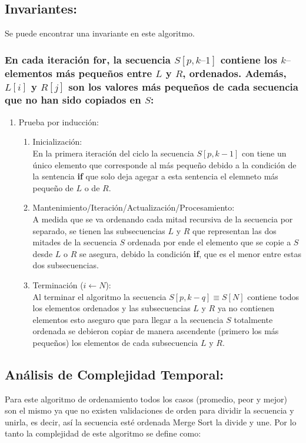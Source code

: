 \documentclass[12pt,spanish]{article}
\theoremstyle{definition}
\begin{document}
\subsection{Invariantes:}{}
Se puede encontrar una invariante en este algoritmo.
\subsubsection{En cada iteración \textbf{for}, la secuencia $S[p, k–1]$ contiene los $k–$elementos más pequeños entre $L$ y $R$, ordenados. Además, $L[i]$ y $R [j]$ son los valores más pequeños de cada secuencia que no han sido copiados en $S$:}{}

\begin{enumerate}

\item Prueba por inducción:
    \begin{enumerate}
    \item Inicialización:\\
        En la primera iteración del ciclo la secuencia $S[p,k-1]$ con tiene un único elemento que corresponde al más pequeño debido a la condición de la sentencia \textbf{if} que solo deja agegar a esta sentencia el elemneto más pequeño de $L$ o de $R$.
    \item Mantenimiento/Iteración/Actualización/Procesamiento:\\
        A medida que se va ordenando cada mitad recursiva de la secuencia por separado, se tienen las subsecuencias $L$ y $R$ que representan las dos mitades de la secuencia $S$ ordenada por ende el elemento que se copie a $S$ desde $L$ o $R$ se asegura, debido la condición \textbf{if}, que es  el menor entre estas dos subsecuencias.
    \item Terminación ($ i \leftarrow N $): \\
        Al terminar el algoritmo la secuencia $S[p,k-q] \equiv S[N]$  contiene todos los elementos ordenados y las subsecuencias $L$ y $R$ ya no contienen elementos esto aseguro que para llegar a la secuencia $S$ totalmente ordenada se debieron copiar de manera ascendente (primero los más pequeños) los elementos de cada subsecuencia $L$ y $R$.
    \end{enumerate}
 \end{enumerate}

\subsection{ Análisis de Complejidad Temporal:}
Para este algoritmo de ordenamiento todos los casos (promedio, peor y mejor) son el mismo ya que no existen validaciones de orden para dividir la secuencia y unirla, es decir, así la secuencia esté ordenada Merge Sort la divide y une.
Por lo tanto la complejidad de este algoritmo se define como:
\end{document}
